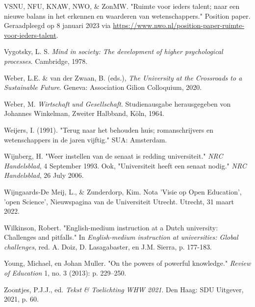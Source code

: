 \documentclass[smallauthor, chapterhaspagenum, nochapterinheader, pagenuminheader,  bigchapnum,medium2, tocpages,  garamond, titleinheader]{jote-book}
\begin{document}
\begin{references}
		VSNU, NFU, KNAW, NWO, \& ZonMW. "Ruimte voor ieders talent; naar een nieuwe balans in het erkennen en waarderen van wetenschappers." Position paper. Geraadpleegd op 8 januari 2023 via \href{https://www.nwo.nl/position-paper-ruimte-voor-ieders-talent}{https://www.nwo.nl/position-paper-ruimte-voor-ieders-talent}.



		Vygotsky, L. S. \emph{Mind in society: The development of higher psychological processes}. Cambridge, 1978.



		Weber, L.E. \& van der Zwaan, B. (eds.), \emph{The University at the Crossroads to a Sustainable Future}. Geneva: Association Gilion Colloquium, 2020.



		Weber, M. \emph{Wirtschaft}\emph{ und Gesellschaft}. Studienausgabe herausgegeben von Johannes Winkelman, Zweiter Halbband, Köln, 1964.



		Weijers, I. (1991). "Terug naar het behouden huis; romanschrijvers en wetenschappers in de jaren vijftig." SUA: Amsterdam.



		Wijnberg, H. "Weer instellen van de senaat is redding universiteit." \emph{NRC }\emph{Handelsblad}, 4 September 1993. Ook, "Universiteit heeft een senaat nodig." \emph{NRC }\emph{Handelsblad}, 26 July 2006.



		Wijngaards-De Meij, L., \& Zunderdorp, Kim. Nota 'Visie op Open Education', 'open Science', Nieuwspagina van de Universiteit Utrecht. Utrecht, 31 maart 2022.



		Wilkinson, Robert. "English-medium instruction at a Dutch university: Challenges and pitfalls." In \emph{English-medium instruction at universities: Global challenges}, red. A. Doiz, D. Lasagabaster, en J.M. Sierra, p. 177-183.



		Young, Michael, en Johan Muller. "On the powers of powerful knowledge." \emph{Review of Education} 1, no. 3 (2013): p. 229--250.



		Zoontjes, P.J.J., ed. \emph{Tekst}\emph{ \& }\emph{Toelichting}\emph{ WHW 2021}. Den Haag: SDU Uitgever, 2021, p. 60.


	\end{references}







	\printindex
\end{document}
